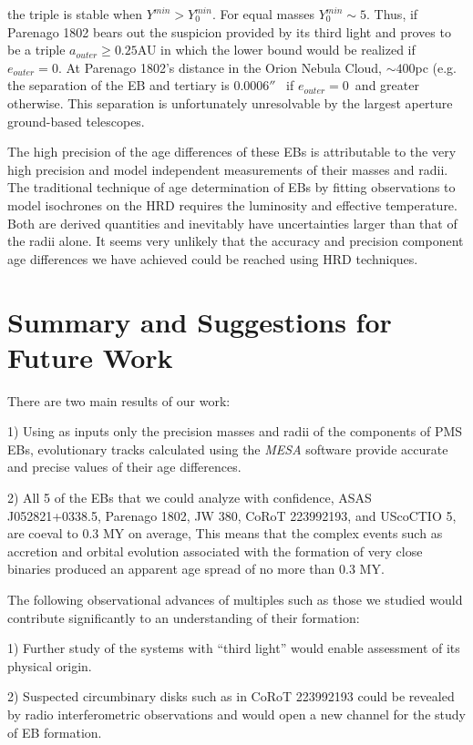 \documentclass[12pt,preprint]{aastex6}
\begin{document}
\noindent
{the triple is stable when $Y^{min} > Y^{min}_0$. For
equal masses $Y^{min}_0\sim 5$.  Thus, if Parenago 1802 bears
out the suspicion provided by its third light and proves
to be a triple $ a_{outer} \ge 0.25$AU in which the lower
bound would be realized if $e_{outer}=0$. At Parenago 1802's 
distance in the Orion Nebula Cloud, $\sim 400$pc
(e.g. \citet{2007MNRAS.376.1109J} the separation of the EB 
and tertiary is  $0.0006''$~ if $e_{outer}=0$~and greater 
otherwise.  This separation is unfortunately unresolvable 
by the largest aperture ground-based telescopes.

The high precision of the age differences of these EBs 
is attributable to the very high precision and model independent
measurements of their masses and radii.  The traditional technique 
of age determination of EBs by fitting observations to  model isochrones
on the HRD requires the luminosity and effective
temperature.  Both are derived quantities and inevitably have
uncertainties larger than that of the radii alone. 
It seems very unlikely that the accuracy and precision
component age differences we have achieved could be 
reached using HRD techniques. 

\section{Summary and Suggestions for Future Work}

There are two main results of our work:
\vskip 0.5cm

1)  Using as inputs only the precision masses and radii of the
components of PMS EBs, evolutionary tracks calculated using the
{\it MESA} software provide accurate and precise values of their
age differences.

2)  All 5 of the EBs that we could analyze with confidence,
 ASAS J052821+0338.5, Parenago 1802, JW 380, CoRoT 223992193, 
and  UScoCTIO 5, are coeval to 0.3 MY on average,  This means
that the complex events such as accretion and orbital evolution
associated with the formation of very close binaries produced
an apparent age spread of no more than 0.3 MY.


\vskip 0.5cm
The following observational advances of multiples
such as those we studied would contribute significantly to an 
understanding of their formation:

1) Further study of the systems with ``third light'' would enable 
assessment of its physical origin. 


2) Suspected circumbinary disks such as in CoRoT 223992193  
\citep{2014A&A...562A..50G} could be revealed  
by radio interferometric observations and would open a 
new channel for the study of EB formation.

}
\end{document}
